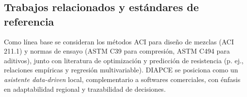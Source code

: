 \subsection{Trabajos relacionados y estándares de referencia}
Como línea base se consideran los métodos ACI para diseño de mezclas (ACI 211.1) y normas de ensayo (ASTM C39 para compresión, ASTM C494 para aditivos), junto con literatura de optimización y predicción de resistencia (p. ej., relaciones empíricas y regresión multivariable). DIAPCE se posiciona como un \textit{asistente data-driven} local, complementario a softwares comerciales, con énfasis en adaptabilidad regional y trazabilidad de decisiones.